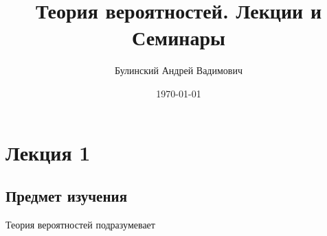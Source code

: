 \documentclass[a4paper, 12pt]{article}
\author{Булинский Андрей Вадимович}
\title{Теория вероятностей. Лекции и Семинары}
\date{\today}
\begin{document}
	\maketitle
	\newpage
	\tableofcontents
	\newpage
	\section{Лекция 1}
	\subsection{Предмет изучения}
	Теория вероятностей подразумевает
\end{document}
